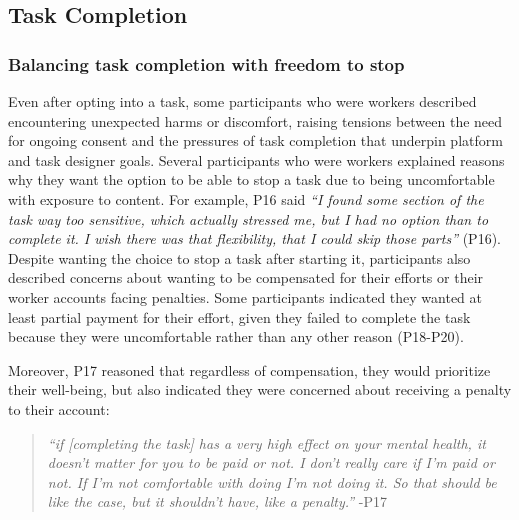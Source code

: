 \subsection{Task Completion}

\subsubsection{Balancing task completion with freedom to stop}
Even after opting into a task, some participants who were workers described encountering unexpected harms or discomfort, raising tensions between the need for ongoing consent and the pressures of task completion that underpin platform and task designer goals.
Several participants who were workers explained reasons why they want the option to be able to stop a task due to being uncomfortable with exposure to content. For example, P16 said \textit{``I found some section of the task way too sensitive, which actually stressed me, but I had no option than to complete it. I wish there was that flexibility, that I could skip those parts''} (P16). Despite wanting the choice to stop a task after starting it, participants also described concerns about wanting to be compensated for their efforts or their worker accounts facing penalties. Some participants indicated they wanted at least partial payment for their effort, given they failed to complete the task because they were uncomfortable rather than any other reason (P18-P20). 

Moreover, P17 reasoned that regardless of compensation, they would prioritize their well-being, but also indicated they were concerned about receiving a penalty to their account:
\begin{quote}
    \textit{``if [completing the task] has a very high effect on your mental health, it doesn't matter for you to be paid or not. I don't really care if I'm paid or not. If I'm not comfortable with doing I'm not doing it. So that should be like the case, but it shouldn't have, like a penalty.''} -P17
\end{quote}


